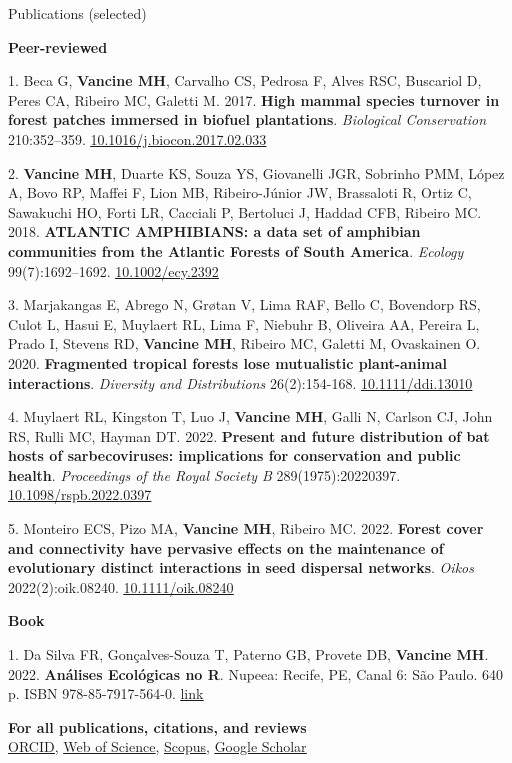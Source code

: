 \documentclass{resume}
\begin{document}
\begin{rSection}{Publications (selected)}

{\bf Peer-reviewed}

1. Beca G, {\bf Vancine MH}, Carvalho CS, Pedrosa F, Alves RSC, Buscariol D, Peres CA, Ribeiro MC, Galetti M. 2017. {\bf High mammal species turnover in forest patches immersed in biofuel plantations}. {\it Biological Conservation} 210:352–359. \href{https://doi.org/10.1016/j.biocon.2017.02.033}{\underline{10.1016/j.biocon.2017.02.033}}

2. {\bf Vancine MH}, Duarte KS, Souza YS, Giovanelli JGR, Sobrinho PMM, López A, Bovo RP, Maffei F, Lion MB, Ribeiro-Júnior JW, Brassaloti R, Ortiz C, Sawakuchi HO, Forti LR, Cacciali P, Bertoluci J, Haddad CFB, Ribeiro MC. 2018. {\bf ATLANTIC AMPHIBIANS: a data set of amphibian communities from the Atlantic Forests of South America}. {\it Ecology} 99(7):1692–1692. \href{https://doi.org/10.1002/ecy.2392}{\underline{10.1002/ecy.2392}}

3. Marjakangas E, Abrego N, Grøtan V, Lima RAF, Bello C, Bovendorp RS, Culot L, Hasui E, Muylaert RL, Lima F, Niebuhr B, Oliveira AA, Pereira L, Prado I, Stevens RD, {\bf Vancine MH}, Ribeiro MC, Galetti M, Ovaskainen O. 2020. {\bf Fragmented tropical forests lose mutualistic plant-animal interactions}. {\it Diversity and Distributions} 26(2):154-168. \href{https://doi.org/10.1111/ddi.13010}{\underline{10.1111/ddi.13010}}

4. Muylaert RL, Kingston T, Luo J, {\bf Vancine MH}, Galli N, Carlson CJ, John RS, Rulli MC, Hayman DT. 2022. {\bf Present and future distribution of bat hosts of sarbecoviruses: implications for conservation and public health}. {\it Proceedings of the Royal Society B} 289(1975):20220397. \href{https://doi.org/10.1098/rspb.2022.0397}{\underline{10.1098/rspb.2022.0397}}

5. Monteiro ECS, Pizo MA, {\bf Vancine MH}, Ribeiro MC. 2022. {\bf Forest cover and connectivity have pervasive effects on the maintenance of evolutionary distinct interactions in seed dispersal networks}. {\it Oikos} 2022(2):oik.08240. \href{https://doi.org/10.1111/oik.08240}{\underline{10.1111/oik.08240}}

{\bf Book}

1. Da Silva FR, Gonçalves-Souza T, Paterno GB, Provete DB, {\bf Vancine MH}. 2022. {\bf Análises Ecológicas no R}. Nupeea: Recife, PE, Canal 6: São Paulo. 640 p. ISBN 978-85-7917-564-0. \href{https://analises-ecologicas.com/}{\underline{link}}

{\bf For all publications, citations, and reviews}
\\ \href{https://orcid.org/0000-0001-9650-7575}{\underline{ORCID}}, \href{https://www.webofscience.com/wos/author/record/837504}{\underline{Web of Science}}, \href{https://www.scopus.com/authid/detail.uri?authorId=57193451888}{\underline{Scopus}}, \href{https://scholar.google.com/citations?user=i-2xZBQAAAAJ}{\underline{Google Scholar}}

\end{rSection}
\end{document}

